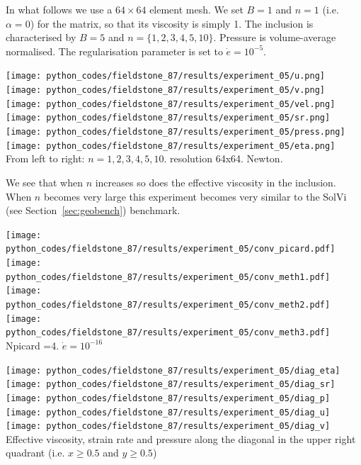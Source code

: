 In what follows we use a $64\times 64$ element mesh. 
We set $B=1$ and $n=1$ (i.e. $\alpha=0$) for the matrix, 
so that its viscosity is simply 1. The inclusion is characterised by $B=5$ and $n=\{1,2,3,4,5,10\}$.
Pressure is volume-average normalised. The regularisation parameter is set to $\dot{e}=10^{-5}$. 

\begin{center}
\texttt{[image: python\_codes/fieldstone\_87/results/experiment\_05/u.png]}
\texttt{[image: python\_codes/fieldstone\_87/results/experiment\_05/v.png]}\\
\texttt{[image: python\_codes/fieldstone\_87/results/experiment\_05/vel.png]}
\texttt{[image: python\_codes/fieldstone\_87/results/experiment\_05/sr.png]}\\
\texttt{[image: python\_codes/fieldstone\_87/results/experiment\_05/press.png]}
\texttt{[image: python\_codes/fieldstone\_87/results/experiment\_05/eta.png]}\\
{\captionfont From left to right: $n=1,2,3,4,5,10$. resolution 64x64. Newton.}
\end{center}

We see that when $n$ increases so does the effective viscosity in the inclusion. When 
$n$ becomes very large this experiment becomes very similar to the SolVi (see 
Section~\ref{sec:geobench}) benchmark.

\begin{center}
\texttt{[image: python\_codes/fieldstone\_87/results/experiment\_05/conv\_picard.pdf]}
\texttt{[image: python\_codes/fieldstone\_87/results/experiment\_05/conv\_meth1.pdf]}\\
\texttt{[image: python\_codes/fieldstone\_87/results/experiment\_05/conv\_meth2.pdf]}
\texttt{[image: python\_codes/fieldstone\_87/results/experiment\_05/conv\_meth3.pdf]}\\
{\captionfont Npicard =4. $\dot{e}=10^{-16}$}
\end{center}


\begin{center}
\texttt{[image: python\_codes/fieldstone\_87/results/experiment\_05/diag\_eta]}
\texttt{[image: python\_codes/fieldstone\_87/results/experiment\_05/diag\_sr]}
\texttt{[image: python\_codes/fieldstone\_87/results/experiment\_05/diag\_p]}\\
\texttt{[image: python\_codes/fieldstone\_87/results/experiment\_05/diag\_u]}
\texttt{[image: python\_codes/fieldstone\_87/results/experiment\_05/diag\_v]}\\
{\captionfont Effective viscosity, strain rate and pressure along the diagonal in the 
upper right quadrant (i.e. $x\ge 0.5$ and $y\ge 0.5$)}
\end{center}

